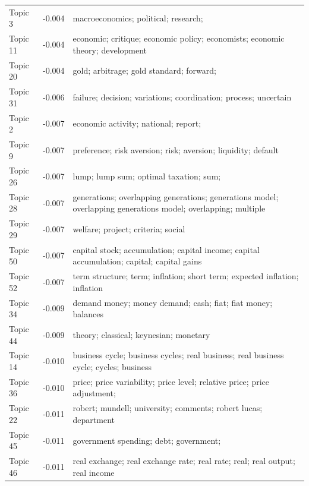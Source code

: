 \documentclass[]{elsarticle} %
\begin{document}
\begin{table}[!h]
\begin{threeparttable}
\begin{tabular}[t]{lrl}
Topic 3 & -0.004 & macroeconomics; political; research;
\cellcolor{gray!6}{review; economics; science}\\
Topic 11 & -0.004 & economic; critique; economic policy;
economists; economic theory; development\\
Topic 20 & -0.004 & gold; arbitrage; gold standard; forward;
\cellcolor{gray!6}{varying; time varying}\\
\addlinespace
Topic 31 & -0.006 & failure; decision; variations;
coordination; process; uncertain\\
Topic 2 & -0.007 & economic activity; national; report;
\cellcolor{gray!6}{activity; national income; depression}\\
Topic 9 & -0.007 & preference; risk aversion; risk;
aversion; liquidity; default\\
Topic 26 & -0.007 & lump; lump sum; optimal taxation; sum;
\cellcolor{gray!6}{optimal tax; internal}\\
Topic 28 & -0.007 & generations; overlapping generations;
generations model; overlapping
generations model; overlapping; multiple\\
\addlinespace
Topic 29 & -0.007 & welfare; project; criteria; social
\cellcolor{gray!6}{security; security; social}\\
Topic 50 & -0.007 & capital stock; accumulation; capital
income; capital accumulation; capital;
capital gains\\
Topic 52 & -0.007 & term structure; term; inflation; short
term; expected inflation; inflation
\cellcolor{gray!6}{rates}\\
Topic 34 & -0.009 & demand money; money demand; cash; fiat;
fiat money; balances\\
Topic 44 & -0.009 & theory; classical; keynesian; monetary
\cellcolor{gray!6}{theory; quantity; quantity theory}\\
\addlinespace
Topic 14 & -0.010 & business cycle; business cycles; real
business; real business cycle; cycles;
business\\
Topic 36 & -0.010 & price; price variability; price level;
relative price; price adjustment;
\cellcolor{gray!6}{variability}\\
Topic 22 & -0.011 & robert; mundell; university; comments;
robert lucas; department\\
Topic 45 & -0.011 & government spending; debt; government;
\cellcolor{gray!6}{government debt; spending; purchases}\\
Topic 46 & -0.011 & real exchange; real exchange rate; real
rate; real; real output; real income\\

\end{tabular}
\end{threeparttable}
\end{table}
\end{document}
